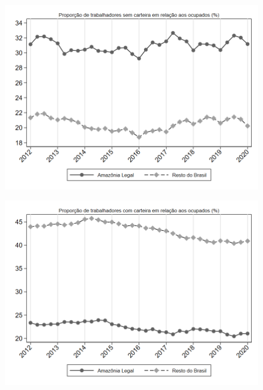 \begin{frame}[label=_estrutura_emprego_prop_empregadoSC]{}
\textit{\hyperlink{_estrutura_emprego}{}}
\begin{figure}
  \centering
  \includegraphics[width=1.0\linewidth]{../../analysis/output/estrutura_emprego/_estrutura_emprego_prop_empregadoSC.png}
  \caption{}
  \label{fig:_estrutura_emprego_prop_empregadoSC}
\end{figure}
\end{frame}

\begin{frame}[label=_estrutura_emprego_prop_empregadoCC]{}
\textit{\hyperlink{_estrutura_emprego}{}}
\begin{figure}
  \centering
  \includegraphics[width=1.0\linewidth]{../../analysis/output/estrutura_emprego/_estrutura_emprego_prop_empregadoCC.png}
  \caption{}
  \label{fig:_estrutura_emprego_prop_empregadoCC}
\end{figure}
\end{frame}

